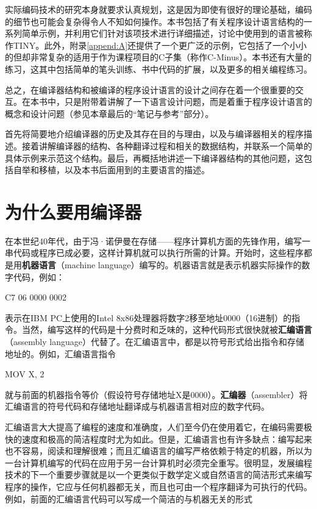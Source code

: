 \documentclass[lang=cn,10pt]{elegantbook}
\begin{document}
实际编码技术的研究本身就要求认真规划，这是因为即使有很好的理论基础，编码的细节也可能会复杂得令人不知如何操作。本书包括了有关程序设计语言结构的一系列简单示例，并利用它们针对该项技术进行详细描述，讨论中使用到的语言被称作TINY。此外，附录\ref{append:A}还提供了一个更广泛的示例，它包括了一个小小的但却非常复杂的适用于作为课程项目的C子集（称作C-Minus）。本书还有大量的练习，这其中包括简单的笔头训练、书中代码的扩展，以及更多的相关编程练习。

总之，在编译器结构和被编译的程序设计语言的设计之间存在着一个很重要的交互。在本书中，只是附带着讲解了一下语言设计问题，而是着重于程序设计语言的概念和设计问题（参见本章最后的“笔记与参考”部分）。

首先将简要地介绍编译器的历史及其存在目的与理由，以及与编译器相关的程序描述。接着讲解编译器的结构、各种翻译过程和相关的数据结构，并联系一个简单的具体示例来示范这个结构。最后，再概括地讲述一下编译器结构的其他问题，这包括自举和移植，以及本书后面用到的主要语言的描述。

\section{为什么要用编译器}
\label{sec:1-1}

在本世纪40年代，由于冯·诺伊曼在存储——程序计算机方面的先锋作用，编写一串代码或程序已成必要，这样计算机就可以执行所需的计算。开始时，这些程序都是用\textbf{机器语言}（machine language）编写的。机器语言就是表示机器实际操作的数字代码，例如：

C7 06 0000 0002

表示在IBM PC上使用的Intel 8x86处理器将数字2移至地址0000（16进制）的指令。当然，编写这样的代码是十分费时和乏味的，这种代码形式很快就被\textbf{汇编语言}（assembly language）代替了。在汇编语言中，都是以符号形式给出指令和存储地址的。例如，汇编语言指令

MOV X, 2

就与前面的机器指令等价（假设符号存储地址X是0000）。\textbf{汇编器}（assembler）将汇编语言的符号代码和存储地址翻译成与机器语言相对应的数字代码。

汇编语言大大提高了编程的速度和准确度，人们至今仍在使用着它，在编码需要极快的速度和极高的简洁程度时尤为如此。但是，汇编语言也有许多缺点：编写起来也不容易，阅读和理解很难；而且汇编语言的编写严格依赖于特定的机器，所以为一台计算机编写的代码在应用于另一台计算机时必须完全重写。很明显，发展编程技术的下一个重要步骤就是以一个更类似于数学定义或自然语言的简洁形式来编写程序的操作，它应与任何机器都无关，而且也可由一个程序翻译为可执行的代码。例如，前面的汇编语言代码可以写成一个简洁的与机器无关的形式
\end{document}
